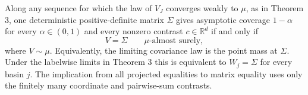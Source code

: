 Along any sequence for which the law of \(V_J\) converges weakly to \(\mu\), as in Theorem 3, one deterministic positive-definite matrix \(\Sigma\) gives asymptotic coverage \(1-\alpha\) for every \(\alpha\in(0,1)\) and every nonzero contrast \(c\in\mathbb R^d\) if and only if
\[
 V=\Sigma\qquad\mu\text{-almost surely},
\]
where \(V\sim\mu\). Equivalently, the limiting covariance law is the point mass at \(\Sigma\). Under the labelwise limits in Theorem 3 this is equivalent to \(W_j=\Sigma\) for every basin \(j\). The implication from all projected equalities to matrix equality uses only the finitely many coordinate and pairwise-sum contrasts.